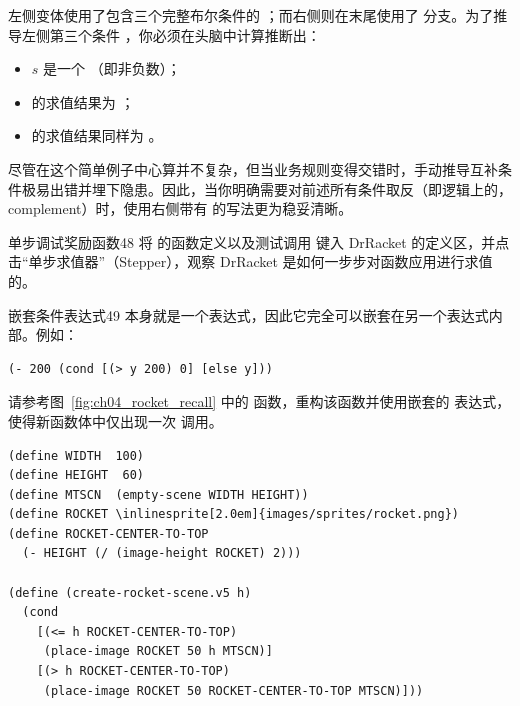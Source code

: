左侧变体使用了包含三个完整布尔条件的 ；而右侧则在末尾使用了  分支。为了推导左侧第三个条件 ，你必须在头脑中计算推断出：
\begin{itemize}
  \item $s$ 是一个 （即非负数）；
  \item {} 的求值结果为 ；
  \item {} 的求值结果同样为 。
\end{itemize}

尽管在这个简单例子中心算并不复杂，但当业务规则变得交错时，手动推导互补条件极易出错并埋下隐患。因此，当你明确需要对前述所有条件取反（即逻辑上的，complement）时，使用右侧带有  的写法更为稳妥清晰。

\begin{exercise}{单步调试奖励函数}{48}
将  的函数定义以及测试调用  键入 DrRacket 的定义区，并点击“单步求值器”（Stepper），观察 DrRacket 是如何一步步对函数应用进行求值的。
\end{exercise}

\begin{exercise}{嵌套条件表达式}{49}
 本身就是一个表达式，因此它完全可以嵌套在另一个表达式内部。例如：
\begin{lstlisting}[language=BSL]
(- 200 (cond [(> y 200) 0] [else y]))
\end{lstlisting}

请参考图~\ref{fig:ch04_rocket_recall} 中的  函数，重构该函数并使用嵌套的  表达式，使得新函数体中仅出现一次  调用。

\begin{stepperbox}[unbreakable]
\begin{Verbatim}[commandchars=\\\{\}, fontsize=\scriptsize]
(define WIDTH  100)
(define HEIGHT  60)
(define MTSCN  (empty-scene WIDTH HEIGHT))
(define ROCKET \inlinesprite[2.0em]{images/sprites/rocket.png})
(define ROCKET-CENTER-TO-TOP
  (- HEIGHT (/ (image-height ROCKET) 2)))

(define (create-rocket-scene.v5 h)
  (cond
    [(<= h ROCKET-CENTER-TO-TOP)
     (place-image ROCKET 50 h MTSCN)]
    [(> h ROCKET-CENTER-TO-TOP)
     (place-image ROCKET 50 ROCKET-CENTER-TO-TOP MTSCN)]))
\end{Verbatim}
\end{stepperbox}
\begin{center}
  \label{fig:ch04_rocket_recall}
\end{center}
\end{exercise}

